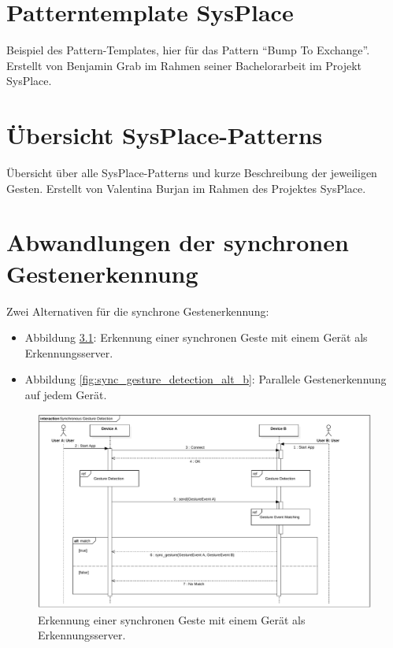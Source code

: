 \appendix
\chapter{Patterntemplate SysPlace}
\label{a:patterntemplate}
Beispiel des Pattern-Templates, hier für das Pattern "`Bump To Exchange"'. Erstellt von Benjamin Grab im Rahmen seiner Bachelorarbeit im Projekt SysPlace.


\chapter{Übersicht SysPlace-Patterns}
\label{a:patterns_all}
Übersicht über alle SysPlace-Patterns und kurze Beschreibung der jeweiligen Gesten. Erstellt von Valentina Burjan im Rahmen des Projektes SysPlace.


\chapter{Abwandlungen der synchronen Gestenerkennung}
\label{a:sync_gestures}
Zwei Alternativen für die synchrone Gestenerkennung:
\begin{itemize}
\item Abbildung \ref{fig:sync_gesture_detection_alt_a}: Erkennung einer synchronen Geste mit einem Gerät als Erkennungsserver.
\item Abbildung \ref{fig:sync_gesture_detection_alt_b}: Parallele Gestenerkennung auf jedem Gerät.
\end{itemize}

\begin{figure}
\centering
\includegraphics[width=1\textwidth]{bilder/sync_gesture_detection_alt_a}
\caption{Erkennung einer synchronen Geste mit einem Gerät als Erkennungsserver.}
\label{fig:sync_gesture_detection_alt_a}
\end{figure}

